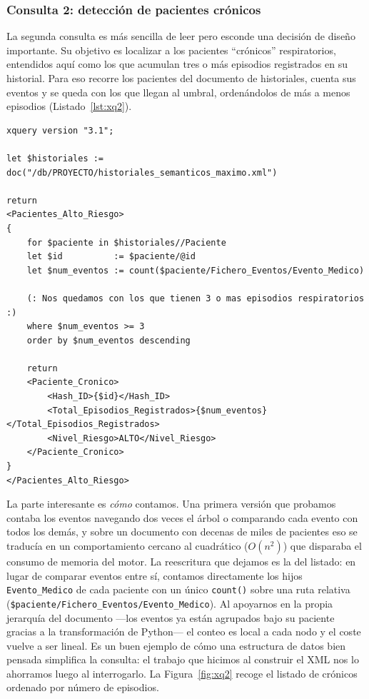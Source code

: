 \documentclass[../main.tex]{subfiles}
\begin{document}
\subsubsection{Consulta 2: detección de pacientes crónicos}

La segunda consulta es más sencilla de leer pero esconde una decisión de diseño importante. Su objetivo es localizar a los pacientes \enquote{crónicos} respiratorios, entendidos aquí como los que acumulan tres o más episodios registrados en su historial. Para eso recorre los pacientes del documento de historiales, cuenta sus eventos y se queda con los que llegan al umbral, ordenándolos de más a menos episodios (Listado~\ref{lst:xq2}).

\begin{lstlisting}[caption={Consulta XQuery 2: detección de pacientes crónicos con tres o más episodios.}, label={lst:xq2}]
xquery version "3.1";

let $historiales := doc("/db/PROYECTO/historiales_semanticos_maximo.xml")

return
<Pacientes_Alto_Riesgo>
{
    for $paciente in $historiales//Paciente
    let $id          := $paciente/@id
    let $num_eventos := count($paciente/Fichero_Eventos/Evento_Medico)

    (: Nos quedamos con los que tienen 3 o mas episodios respiratorios :)
    where $num_eventos >= 3
    order by $num_eventos descending

    return
    <Paciente_Cronico>
        <Hash_ID>{$id}</Hash_ID>
        <Total_Episodios_Registrados>{$num_eventos}</Total_Episodios_Registrados>
        <Nivel_Riesgo>ALTO</Nivel_Riesgo>
    </Paciente_Cronico>
}
</Pacientes_Alto_Riesgo>
\end{lstlisting}

La parte interesante es \textit{cómo} contamos. Una primera versión que probamos contaba los eventos navegando dos veces el árbol o comparando cada evento con todos los demás, y sobre un documento con decenas de miles de pacientes eso se traducía en un comportamiento cercano al cuadrático ($O(n^2)$) que disparaba el consumo de memoria del motor. La reescritura que dejamos es la del listado: en lugar de comparar eventos entre sí, contamos directamente los hijos \texttt{Evento\_Medico} de cada paciente con un único \texttt{count()} sobre una ruta relativa (\texttt{\$paciente/Fichero\_Eventos/Evento\_Medico}). Al apoyarnos en la propia jerarquía del documento ---los eventos ya están agrupados bajo su paciente gracias a la transformación de Python--- el conteo es local a cada nodo y el coste vuelve a ser lineal. Es un buen ejemplo de cómo una estructura de datos bien pensada simplifica la consulta: el trabajo que hicimos al construir el XML nos lo ahorramos luego al interrogarlo. La Figura~\ref{fig:xq2} recoge el listado de crónicos ordenado por número de episodios.
\end{document}
